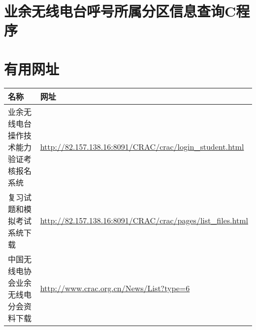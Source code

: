 \section{业余无线电台呼号所属分区信息查询C程序}



\newpage

\section{有用网址}

\begin{longtable}{|p{8cm}|p{8cm}|}
	\hline
	\textbf{名称} & \textbf{网址} \\
	\hline
	业余无线电台操作技术能力验证考核报名系统 & \url{http://82.157.138.16:8091/CRAC/crac/login_student.html} \\
	\hline
	复习试题和模拟考试系统下载 & \url{http://82.157.138.16:8091/CRAC/crac/pages/list_files.html} \\
	\hline
	中国无线电协会业余无线电分会资料下载 & \url{http://www.crac.org.cn/News/List?type=6} \\
	\hline
\end{longtable}
